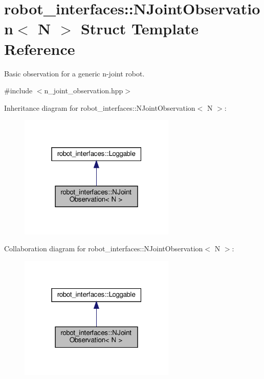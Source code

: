 \hypertarget{structrobot__interfaces_1_1NJointObservation}{}\section{robot\+\_\+interfaces\+:\+:N\+Joint\+Observation$<$ N $>$ Struct Template Reference}
\label{structrobot__interfaces_1_1NJointObservation}


Basic observation for a generic n-\/joint robot.  




{\ttfamily \#include $<$n\+\_\+joint\+\_\+observation.\+hpp$>$}



Inheritance diagram for robot\+\_\+interfaces\+:\+:N\+Joint\+Observation$<$ N $>$\+:
\nopagebreak
\begin{figure}[H]
\begin{center}
\leavevmode
\includegraphics[width=211pt]{structrobot__interfaces_1_1NJointObservation__inherit__graph}
\end{center}
\end{figure}


Collaboration diagram for robot\+\_\+interfaces\+:\+:N\+Joint\+Observation$<$ N $>$\+:
\nopagebreak
\begin{figure}[H]
\begin{center}
\leavevmode
\includegraphics[width=211pt]{structrobot__interfaces_1_1NJointObservation__coll__graph}
\end{center}
\end{figure}
